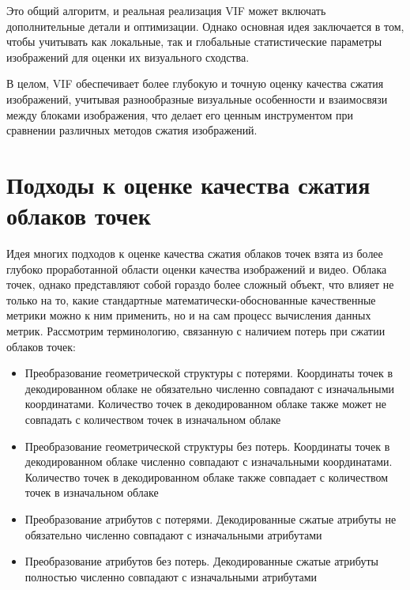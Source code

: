 
Это общий алгоритм, и реальная реализация VIF может включать дополнительные
детали и оптимизации. Однако основная идея заключается в том, чтобы учитывать
как локальные, так и глобальные статистические параметры изображений для оценки
их визуального сходства.


В целом, VIF обеспечивает более глубокую и точную оценку качества сжатия
изображений, учитывая разнообразные визуальные особенности и взаимосвязи между
блоками изображения, что делает его ценным инструментом при сравнении различных
методов сжатия изображений.


\section{Подходы к оценке качества сжатия облаков точек}




Идея многих подходов к оценке качества сжатия облаков точек взята из более
глубоко проработанной области оценки качества изображений и видео. Облака точек,
однако представляют собой гораздо более сложный объект, что влияет не только на
то, какие стандартные математически-обоснованные качественные метрики можно к
ним применить, но и на сам процесс вычисления данных метрик. Рассмотрим
терминологию, связанную с наличием потерь при сжатии облаков
точек\cite{CallForProposalV2}:

\begin{itemize}
    \item Преобразование геометрической структуры с потерями. Координаты точек в
    декодированном облаке не обязательно численно совпадают с изначальными
    координатами. Количество точек в декодированном облаке также может не
    совпадать с количеством точек в изначальном облаке
    \item Преобразование геометрической структуры без потерь. Координаты точек в
    декодированном облаке численно совпадают с изначальными координатами.
    Количество точек в декодированном облаке также совпадает с количеством точек
    в изначальном облаке
    \item Преобразование атрибутов с потерями. Декодированные сжатые атрибуты не
    обязательно численно совпадают с изначальными атрибутами
    \item Преобразование атрибутов без потерь. Декодированные сжатые атрибуты
    полностью численно совпадают с изначальными атрибутами
\end{itemize}


